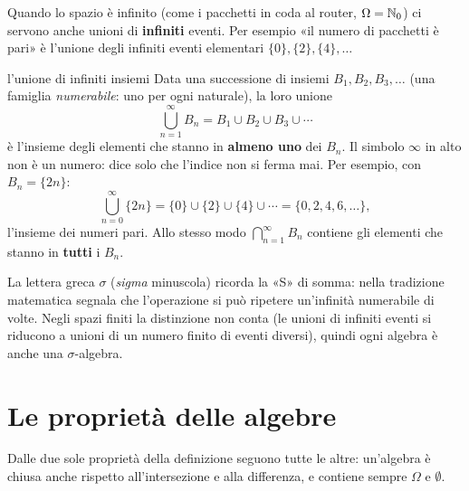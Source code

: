 Quando lo spazio è infinito (come i pacchetti in coda al router, $\Omega = \mathbb{N}_0$) ci servono anche unioni di
\textbf{infiniti} eventi. Per esempio «il numero di pacchetti è pari» è l'unione degli infiniti eventi elementari
$\{0\}, \{2\}, \{4\}, \ldots$

\begin{richiamo}{l'unione di infiniti insiemi}
Data una successione di insiemi $B_1, B_2, B_3, \ldots$ (una famiglia \emph{numerabile}: uno per ogni naturale), la loro
unione
\[ \bigcup_{n=1}^{\infty} B_n = B_1 \cup B_2 \cup B_3 \cup \cdots \]
è l'insieme degli elementi che stanno in \textbf{almeno uno} dei $B_n$. Il simbolo $\infty$ in alto non è un numero:
dice solo che l'indice non si ferma mai. Per esempio, con $B_n = \{2n\}$:
\[ \bigcup_{n=0}^{\infty} \{2n\} = \{0\} \cup \{2\} \cup \{4\} \cup \cdots = \{0, 2, 4, 6, \ldots\} , \]
l'insieme dei numeri pari. Allo stesso modo $\bigcap_{n=1}^{\infty} B_n$ contiene gli elementi che stanno in
\textbf{tutti} i $B_n$.
\end{richiamo}


La lettera greca $\sigma$ (\emph{sigma} minuscola) ricorda la «S» di somma: nella tradizione matematica segnala che
l'operazione si può ripetere un'infinità numerabile di volte. Negli spazi finiti la distinzione non conta (le unioni
di infiniti eventi si riducono a unioni di un numero finito di eventi diversi), quindi ogni algebra è anche una
$\sigma$-algebra.

\section{Le proprietà delle algebre}

Dalle due sole proprietà della definizione seguono tutte le altre: un'algebra è chiusa anche rispetto
all'intersezione e alla differenza, e contiene sempre $\Omega$ e $\emptyset$.


